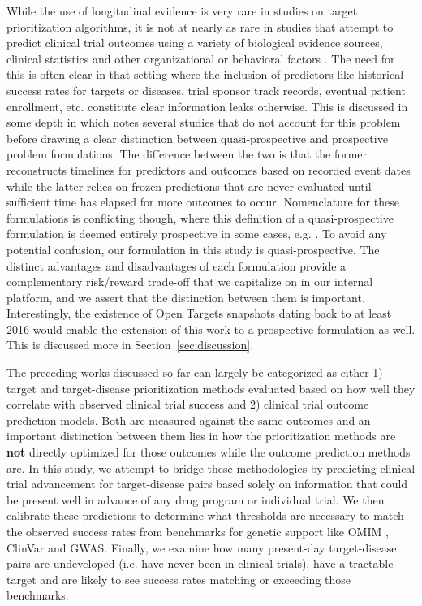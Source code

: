 \documentclass{article}
\begin{document}
While the use of longitudinal evidence is very rare in studies on target prioritization algorithms, it is not at nearly as rare in studies that attempt to predict clinical trial outcomes using a variety of biological evidence sources, clinical statistics and other organizational or behavioral factors \cite{PMID:37483175, PMID:34430930, Lo2019Machine}. The need for this is often clear in that setting where the inclusion of predictors like historical success rates for targets or diseases, trial sponsor track records, eventual patient enrollment, etc. constitute clear information leaks otherwise. This is discussed in some depth in \cite{PMID:37483175} which notes several studies that do not account for this problem before drawing a clear distinction between quasi-prospective and prospective problem formulations. The difference between the two is that the former reconstructs timelines for predictors and outcomes based on recorded event dates while the latter relies on frozen predictions that are never evaluated until sufficient time has elapsed for more outcomes to occur. Nomenclature for these formulations is conflicting though, where this definition of a quasi-prospective formulation is deemed entirely prospective in some cases, e.g. \cite{PMID:37225853}. To avoid any potential confusion, our formulation in this study is quasi-prospective. The distinct advantages and disadvantages of each formulation provide a complementary risk/reward trade-off that we capitalize on in our internal platform, and we assert that the distinction between them is important. Interestingly, the existence of Open Targets snapshots dating back to at least 2016 would enable the extension of this work to a prospective formulation as well. This is discussed more in Section~\ref{sec:discussion}.

The preceding works discussed so far can largely be categorized as either 1) target and target-disease prioritization methods evaluated based on how well they correlate with observed clinical trial success and 2) clinical trial outcome prediction models. Both are measured against the same outcomes and an important distinction between them lies in how the prioritization methods are {\bf not} directly optimized for those outcomes while the outcome prediction methods are. In this study, we attempt to bridge these methodologies by predicting clinical trial advancement for target-disease pairs based solely on information that could be present well in advance of any drug program or individual trial. We then calibrate these predictions to determine what thresholds are necessary to match the observed success rates from benchmarks for genetic support like OMIM \cite{PMID:15608251}, ClinVar \cite{PMID:24234437} and GWAS. Finally, we examine how many present-day target-disease pairs are undeveloped (i.e. have never been in clinical trials), have a tractable target and are likely to see success rates matching or exceeding those benchmarks.
\end{document}
